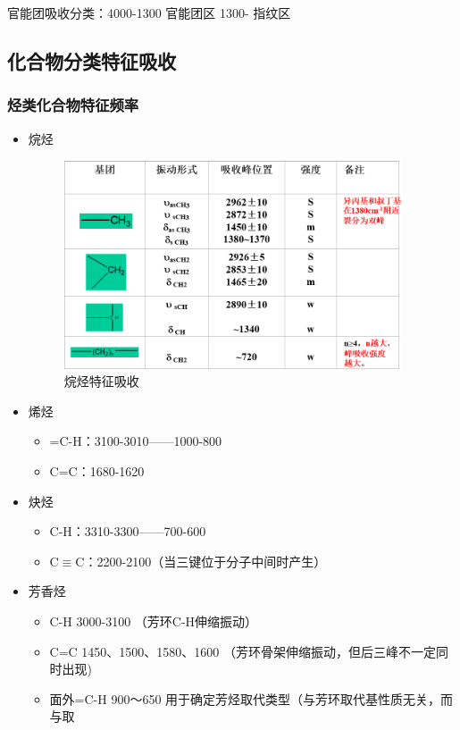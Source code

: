 \begin{note}
    官能团吸收分类：4000-1300 官能团区   1300- 指纹区
\end{note}
\subsection{化合物分类特征吸收}
\subsubsection*{ 烃类化合物特征频率}
\begin{itemize}
    \item 烷烃
    \begin{figure}[ht]
        \centering
        \includegraphics[width=10cm]{image/chp5_ch.png}
        \caption{烷烃特征吸收}
        \label{fig:chp5_ch}
    \end{figure}
    \item 烯烃
    \begin{itemize}
        \item =C-H：3100-3010——1000-800
        \item C=C：1680-1620
    \end{itemize}
    \item 炔烃
    \begin{itemize}
        \item C-H：3310-3300——700-600
        \item C$\equiv$C：2200-2100（当三键位于分子中间时产生）
    \end{itemize}
    \item 芳香烃
    \begin{itemize}
        \item C-H   3000-3100 （芳环C-H伸缩振动）
        \item C=C  1450、1500、1580、1600 （芳环骨架伸缩振动，但后三峰不一定同时出现)
        \item 面外=C-H  900～650  用于确定芳烃取代类型（与芳环取代基性质无关，而与取

\end{itemize}
\end{itemize}
